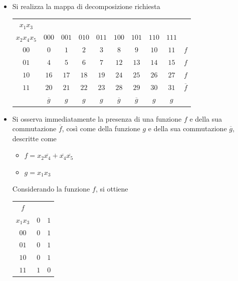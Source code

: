 \documentclass[a4paper]{extarticle}
\renewcommand\arraystretch{}
\begin{document}
\begin{itemize}
    \item Si realizza la mappa di decomposizione richiesta

    \noindent
    \begin{table}[H]
    \setlength{\tabcolsep}{4pt}
    \renewcommand{\arraystretch}{1}
    \centering
    \begin{tabular}{|c|c|c|c|c|c|c|c|c|c}
        $x_1x_3$ &&&&&&&&\\
        $x_2x_4x_5$  & $000$ & $001$ & $010$ & $011$ & $100$ & $101$ & $110$ & $111$ \\
        \hline
        $00$ & \cellcolor{orange!25!white}$0$ & $1$ & $2$ & $3$ & \cellcolor{orange!25!white}$8$ & \cellcolor{orange!25!white}$9$ & $10$ & $11$ & $f$\\
        $01$ & \cellcolor{orange!25!white}$4$ & $5$ & $6$ & $7$ & \cellcolor{orange!25!white}$12$ &\cellcolor{orange!25!white} $13$ & $14$ & $15$ & $f$\\
        $10$ & \cellcolor{orange!25!white}$16$ & $17$ & $18$ & $19$ & \cellcolor{orange!25!white}$24$ & \cellcolor{orange!25!white}$25$ & $26$ & $27$ & $f$\\
        $11$ & $20$ &\cellcolor{orange!25!white} $21$ &\cellcolor{orange!25!white} $22$ & \cellcolor{orange!25!white}$23$ & $28$ & $29$ & \cellcolor{orange!25!white}$30$ & \cellcolor{orange!25!white}$31$ & $\overline{f}$\\
        \hline 
        &$\overline{g}$& $g$ & $g$ & $g$ & $\overline{g}$ & $\overline{g}$ & $g$ & $g$\\ 
    \end{tabular}
    \end{table}

    \item Si osserva immediatamente la presenza di una funzione $f$ e della sua commutazione $\overline{f}$, così come della funzione $g$ e della sua commutazione $\overline{g}$, descritte come
    \begin{itemize}
        \item $f=x_2\overline{x_4} + \overline{x_4}\overline{x_5}$
        \item $g=x_1 x_3$
    \end{itemize}
    Considerando la funzione $f$, si ottiene
    
    \noindent
    \begin{table}[H]
    \setlength{\tabcolsep}{4pt}
    \renewcommand{\arraystretch}{1}
    \centering
    \begin{tabular}{|c|c|c|}
        $f$ & &\\
        $x_1x_3$ & $0$ & $1$\\
        \hline 
        $00$ & $0$ & $1$\\
        $01$ & $0$ & $1$\\
        $10$ & $0$ & $1$\\
        $11$ & $1$ & $0$\\
    \end{tabular}
    \end{table}


\end{itemize}
\end{document}
